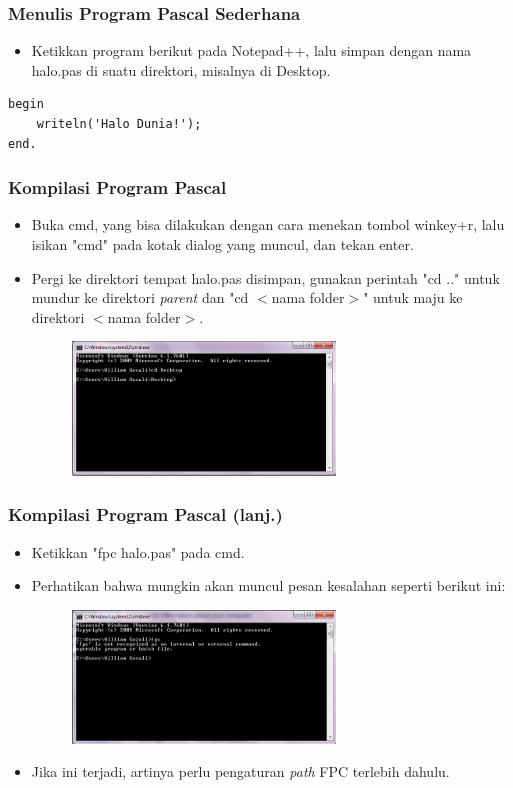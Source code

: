 \documentclass{beamer}
\begin{document}
\begin{frame}[fragile]
\frametitle{Menulis Program Pascal Sederhana}
\begin{itemize}
	\item Ketikkan program berikut pada Notepad++, lalu simpan dengan nama halo.pas di suatu direktori, misalnya di Desktop.
\end{itemize}
\begin{lstlisting}
begin
    writeln('Halo Dunia!');
end.
\end{lstlisting}
\end{frame}

\begin{frame}
\frametitle{Kompilasi Program Pascal}
\begin{itemize}
	\item Buka cmd, yang bisa dilakukan dengan cara menekan tombol winkey+r, lalu isikan "cmd" pada kotak dialog yang muncul, dan tekan enter.
	\item Pergi ke direktori tempat halo.pas disimpan, gunakan perintah "cd .." untuk mundur ke direktori \textit{parent} dan "cd $<$nama folder$>$" untuk maju ke direktori $<$nama folder$>$.
	\begin{figure}
		\includegraphics[width=7cm]{asset/hello_2.PNG}
	\end{figure}
\end{itemize}
\end{frame}

\begin{frame}
\frametitle{Kompilasi Program Pascal (lanj.)}
\begin{itemize}
	\item Ketikkan "fpc halo.pas" pada cmd.
	\item Perhatikan bahwa mungkin akan muncul pesan kesalahan seperti berikut ini:
	\begin{figure}
		\includegraphics[width=7cm]{asset/cmd_0.PNG}
	\end{figure}
	\item Jika ini terjadi, artinya perlu pengaturan \textit{path} FPC terlebih dahulu.
\end{itemize}
\end{frame}
\end{document}
